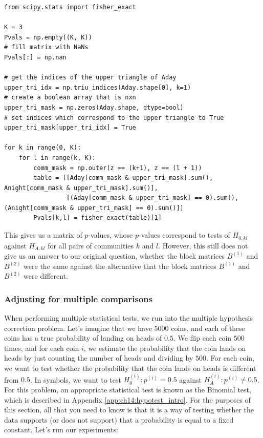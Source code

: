 \begin{lstlisting}[style=python]
from scipy.stats import fisher_exact

K = 3
Pvals = np.empty((K, K))
# fill matrix with NaNs
Pvals[:] = np.nan

# get the indices of the upper triangle of Aday
upper_tri_idx = np.triu_indices(Aday.shape[0], k=1)
# create a boolean array that is nxn
upper_tri_mask = np.zeros(Aday.shape, dtype=bool)
# set indices which correspond to the upper triangle to True
upper_tri_mask[upper_tri_idx] = True

for k in range(0, K):
    for l in range(k, K):
        comm_mask = np.outer(z == (k+1), z == (l + 1))
        table = [[Aday[comm_mask & upper_tri_mask].sum(), Anight[comm_mask & upper_tri_mask].sum()],
                 [(Aday[comm_mask & upper_tri_mask] == 0).sum(), (Anight[comm_mask & upper_tri_mask] == 0).sum()]]
        Pvals[k,l] = fisher_exact(table)[1]
\end{lstlisting}

This gives us a matrix of $p$-values, whose $p$-values correspond to tests of $H_{0, kl}$ against $H_{A, kl}$ for all pairs of communities $k$ and $l$. However, this still does not give us an answer to our original question, whether the block matrices $B^{(1)}$ and $B^{(2)}$ were the same against the alternative that the block matrices $B^{(1)}$ and $B^{(2)}$ were different.

\subsubsection*{Adjusting for multiple comparisons}

When performing multiple statistical tests, we run into the multiple hypothesis correction problem. Let’s imagine that we have $5000$ coins, and each of these coins has a true probability of landing on heads of $0.5$. We flip each coin 
$500$ times, and for each coin $i$, we estimate the probability that the coin lands on heads by just counting the number of heads and dividing by $500$. For each coin, we want to test whether the probability that the coin lands on heads is different from $0.5$. In symbols, we want to test $H_0^{(i)} : p^{(i)} = 0.5$ against $H_A^{(i)}: p^{(i)} \neq 0.5$. For this problem, an appropriate statistical test is known as the Binomial test, which is described in Appendix \ref{app:ch14:hypotest_intro}. For the purposes of this section, all that you need to know is that it is a way of testing whether the data supports (or does not support) that a probability is equal to a fixed constant. Let's run our experiments:

